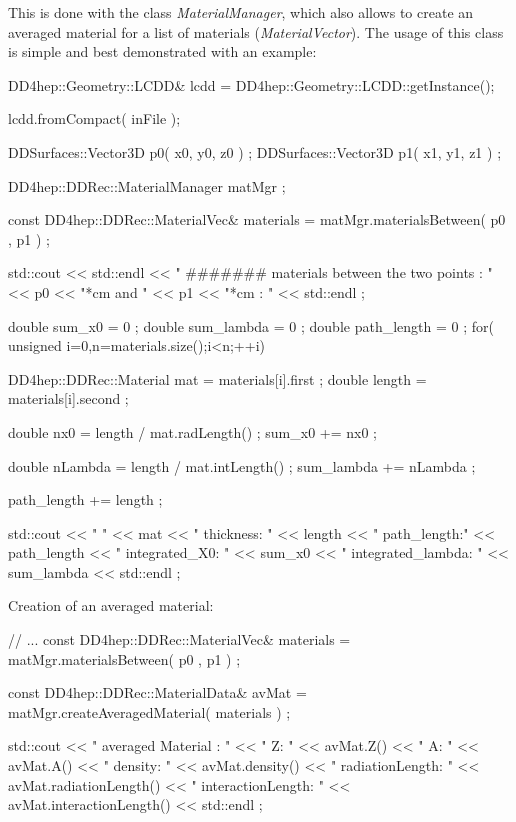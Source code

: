 \documentclass[10pt,a4paper]{article}
\begin{document}
\noindent
This is done with the class {\em MaterialManager}, which also allows to
create an averaged material for a list of materials ({\em MaterialVector}).
The usage of this class is simple and best demonstrated with an example:

\begin{code}

  DD4hep::Geometry::LCDD& lcdd = DD4hep::Geometry::LCDD::getInstance();

  lcdd.fromCompact( inFile );

  DDSurfaces::Vector3D p0( x0, y0, z0 ) ;
  DDSurfaces::Vector3D p1( x1, y1, z1 ) ;

  DD4hep::DDRec::MaterialManager matMgr ;

  const DD4hep::DDRec::MaterialVec& materials = matMgr.materialsBetween( p0 , p1  ) ;
	
  std::cout  << std::endl  
             << " #######  materials between the two  points : " 
             << p0 << "*cm  and " << p1 << "*cm :  "  
             << std::endl ;

  double sum_x0 = 0 ;
  double sum_lambda = 0 ;
  double path_length = 0 ;
  for( unsigned i=0,n=materials.size();i<n;++i){

    DD4hep::DDRec::Material mat =  materials[i].first  ;
    double length = materials[i].second  ;

    double nx0 = length / mat.radLength()  ;
    sum_x0 += nx0 ;

    double nLambda = length / mat.intLength()  ;
    sum_lambda += nLambda ;

    path_length += length ;

    std::cout << "      "               << mat 
              << " thickness: "         << length 
              << " path_length:"        << path_length
              << " integrated_X0: "     << sum_x0 
              << " integrated_lambda: " << sum_lambda 
              <<  std::endl ;
  }

\end{code}

\noindent
Creation of an averaged material:

\begin{code}
  // ...
  const DD4hep::DDRec::MaterialVec& materials = matMgr.materialsBetween( p0 , p1  ) ;
	
  const DD4hep::DDRec::MaterialData& avMat = matMgr.createAveragedMaterial( materials ) ;

  std::cout << " averaged Material : " << " Z: " << avMat.Z() << " A: " << avMat.A() 
            << " density: "            << avMat.density()
            << " radiationLength: "    << avMat.radiationLength() 
            << " interactionLength: "  << avMat.interactionLength()  
            << std::endl ;
\end{code}
\end{document}

